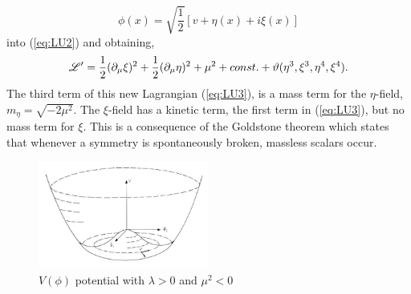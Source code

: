 \begin{equation}
\phi(x)=\sqrt{\frac{1}{2}}[v+\eta(x)+i\xi(x)]
\label{eq:VTerms}
\end{equation}
into (\ref{eq:LU2}) and obtaining,
\begin{equation}
\mathscr{L}'=\frac{1}{2}(\partial_{\mu}\xi)^{2}+\frac{1}{2}(\partial_{\mu}\eta)^2+\mu^{2}+const.+\vartheta(\eta^{3},\xi^{3},\eta^{4},\xi^{4}).
\label{eq:LU3}
\end{equation}
The third term of this new Lagrangian (\ref{eq:LU3}), is a mass term
for the $\eta$-field, $m_{\eta}=\sqrt{-2\mu^{2}}$. The $\xi$-field has
a kinetic term, the first term in (\ref{eq:LU3}), but no mass term
for $\xi$. This is a consequence of the Goldstone theorem which states
that whenever a symmetry is spontaneously broken, massless scalars occur.
\begin{figure}[hb]
  \centering
	\includegraphics[width=0.5\textwidth]{images/mexicanHat.jpg}
  	\caption[Potential]
   	{$V(\phi)$ potential with $\lambda>0$ and $\mu^{2}<0$}
	\label{fig:mexicanHat}
\end{figure}

